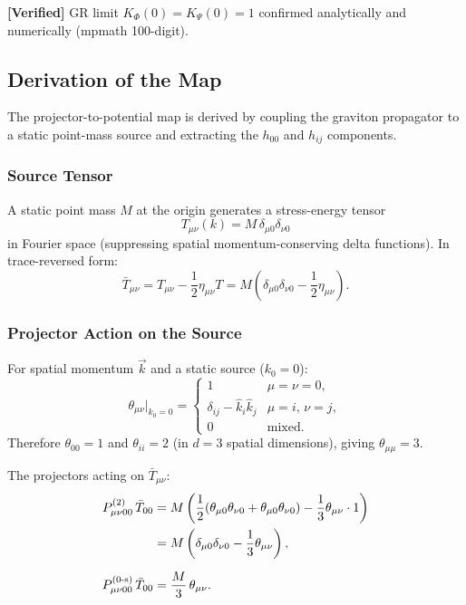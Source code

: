 \documentclass[11pt,a4paper]{article}
\theoremstyle{plain}
\theoremstyle{definition}
\theoremstyle{remark}
\newcommand{\verified}[1]{%
  \par\smallskip\noindent
  \colorbox{green!10}{\parbox{\dimexpr\linewidth-2\fboxsep}{%
    \textcolor{green!50!black}{\textbf{[Verified]}} #1}}%
  \par\smallskip}
\begin{document}
\verified{GR limit $K_\Phi(0) = K_\Psi(0) = 1$ confirmed analytically
and numerically (mpmath 100-digit).}

\subsection{Derivation of the Map}\label{sec:derivation-map}

The projector-to-potential map is derived by coupling the graviton
propagator to a static point-mass source and extracting the $h_{00}$
and $h_{ij}$ components.

\subsubsection{Source Tensor}

A static point mass $M$ at the origin generates a stress-energy tensor
\begin{equation}\label{eq:Tmn-source}
  T_{\mu\nu}(k) = M\,\delta_{\mu 0}\delta_{\nu 0}
\end{equation}
in Fourier space (suppressing spatial momentum-conserving delta
functions).  In trace-reversed form:
\begin{equation}
  \bar{T}_{\mu\nu} = T_{\mu\nu} - \frac{1}{2}\eta_{\mu\nu} T
  = M\left(\delta_{\mu 0}\delta_{\nu 0}
  - \frac{1}{2}\eta_{\mu\nu}\right).
\end{equation}

\subsubsection{Projector Action on the Source}

For spatial momentum $\vec{k}$ and a static source ($k_0 = 0$):
\begin{equation}\label{eq:theta-static}
  \theta_{\mu\nu}\big|_{k_0=0}
  = \begin{cases}
    1 & \mu = \nu = 0,\\
    \delta_{ij} - \hat{k}_i\hat{k}_j & \mu = i,\, \nu = j,\\
    0 & \text{mixed}.
  \end{cases}
\end{equation}
Therefore $\theta_{00} = 1$ and $\theta_{ii} = 2$ (in $d = 3$
spatial dimensions), giving $\theta_{\mu\mu} = 3$.

The projectors acting on $\bar{T}_{\mu\nu}$:
\begin{align}
  P^{(2)}_{\mu\nu 00}\, \bar{T}_{00}
  &= M\left(\frac{1}{2}(\theta_{\mu 0}\theta_{\nu 0}
  + \theta_{\mu 0}\theta_{\nu 0})
  - \frac{1}{3}\theta_{\mu\nu}\cdot 1\right)\notag\\
  &= M\left(\delta_{\mu 0}\delta_{\nu 0}
  - \frac{1}{3}\theta_{\mu\nu}\right),
  \label{eq:P2-on-T}\\[6pt]
  P^{(0\text{-s})}_{\mu\nu 00}\, \bar{T}_{00}
  &= \frac{M}{3}\,\theta_{\mu\nu}.
  \label{eq:P0-on-T}
\end{align}
\end{document}
